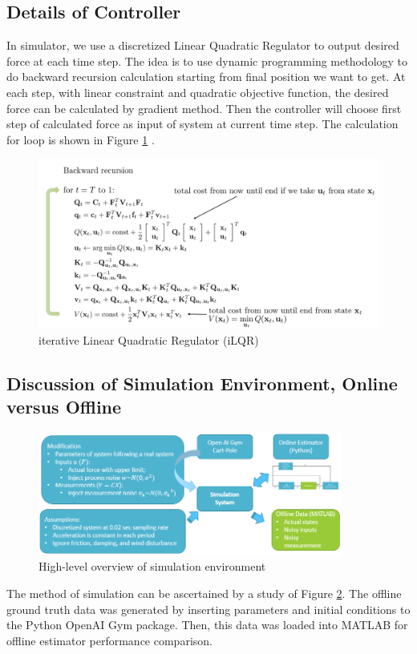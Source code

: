 \documentclass{article}
\begin{document}
\subsection{Details of Controller}
In simulator, we use a discretized Linear Quadratic Regulator to output desired force at each time step. The idea is to use dynamic programming methodology to do backward recursion calculation starting from final position we want to get. At each step, with linear constraint and quadratic objective function, the desired force can be calculated by gradient method. Then the controller will choose first step of calculated force as input of system at current time step. The calculation for loop is shown in Figure \ref{fig:iLQR} \cite{puterman2014markov}.
\begin{figure}[h!]
	\centering
	\includegraphics[width=15cm,keepaspectratio]{LQR.png}
	\caption{iterative Linear Quadratic Regulator (iLQR)}
	\label{fig:iLQR}
\end{figure}
\subsection{Discussion of Simulation Environment, Online versus Offline}
\begin{figure}[h!]
	\centering
	\includegraphics[width=10cm,keepaspectratio]{Simulation.png}
	\caption{High-level overview of simulation environment}
	\label{fig:simulation}
\end{figure}
The method of simulation can be ascertained by a study of Figure \ref{fig:simulation}. The offline ground truth data was generated by inserting parameters and initial conditions to the Python OpenAI Gym package. Then, this data was loaded into MATLAB for offline estimator performance comparison. \\
\end{document}
